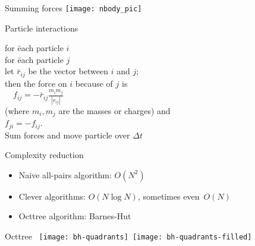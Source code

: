 
\begin{frame}{Summing forces}
  \texttt{[image: nbody\_pic]}
\end{frame}

\begin{frame}{Particle interactions}
  \begin{tabbing}
    for \=each particle $i$\\
    \>for \= each particle $j$\\
    \>\> let $\bar r_{ij}$ be the vector between $i$ and $j$;\\
    \>\> then the force on $i$ because of $j$ is\\
    \>\> $\quad f_{ij} = -\bar r_{ij}\frac{m_im_j}{|r_{ij}|}$\\
    \>\> (where $m_i,m_j$ are the masses or charges) and\\
    \>\> $f_{ji}=-f_{ij}$.\\
    \>Sum forces and move particle over $\Delta t$\\
  \end{tabbing}
\end{frame}

\begin{frame}{Complexity reduction}
  \begin{itemize}
  \item Naive all-pairs algorithm: $O(N^2)$
  \item Clever algorithms: $O(N\log N)$, sometimes even~$O(N)$
  \item Octtree algorithm: Barnes-Hut
  \end{itemize}  
\end{frame}

\begin{frame}{Octtree}
    \hbox{%
  \texttt{[image: bh-quadrants]}
  \texttt{[image: bh-quadrants-filled]}%
  }
\end{frame}

\let\verbatimsize\footnotesize

